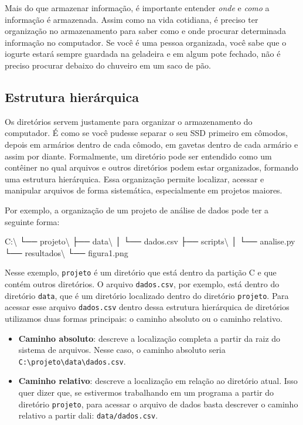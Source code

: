 \documentclass[
  brazilian,
  letterpaper,
  DIV=11,
  numbers=noendperiod]{scrreprt}
\newenvironment{Shaded}{\begin{snugshade}}{\end{snugshade}}
\newcommand{\NormalTok}[1]{\textcolor[rgb]{0.00,0.23,0.31}{#1}}
\providecommand{\tightlist}{%
  \setlength{\itemsep}{0pt}\setlength{\parskip}{0pt}}
\begin{document}
Mais do que armazenar informação, é importante entender \emph{onde} e
\emph{como} a informação é armazenada. Assim como na vida cotidiana, é
preciso ter organização no armazenamento para saber como e onde procurar
determinada informação no computador. Se você é uma pessoa organizada,
você sabe que o iogurte estará sempre guardada na geladeira e em algum
pote fechado, não é preciso procurar debaixo do chuveiro em um saco de
pão.

\subsection{Estrutura hierárquica}\label{estrutura-hieruxe1rquica}

Os diretórios servem justamente para organizar o armazenamento do
computador. É como se você pudesse separar o seu SSD primeiro em
cômodos, depois em armários dentro de cada cômodo, em gavetas dentro de
cada armário e assim por diante. Formalmente, um diretório pode ser
entendido como um contêiner no qual arquivos e outros diretórios podem
estar organizados, formando uma estrutura hierárquica. Essa organização
permite localizar, acessar e manipular arquivos de forma sistemática,
especialmente em projetos maiores.

Por exemplo, a organização de um projeto de análise de dados pode ter a
seguinte forma:

\begin{Shaded}
\begin{Highlighting}[]
\NormalTok{C:\textbackslash{}}
\NormalTok{└── projeto\textbackslash{}}
\NormalTok{    ├── data\textbackslash{}}
\NormalTok{    │   └── dados.csv}
\NormalTok{    ├── scripts\textbackslash{}}
\NormalTok{    │   └── analise.py}
\NormalTok{    └── resultados\textbackslash{}}
\NormalTok{        └── figura1.png}
\end{Highlighting}
\end{Shaded}

Nesse exemplo, \texttt{projeto} é um diretório que está dentro da
partição C e que contém outros diretórios. O arquivo \texttt{dados.csv},
por exemplo, está dentro do diretório \texttt{data}, que é um diretório
localizado dentro do diretório \texttt{projeto}. Para acessar esse
arquivo \texttt{dados.csv} dentro dessa estrutura hierárquica de
diretórios utilizamos duas formas principais: o caminho absoluto ou o
caminho relativo.

\begin{itemize}
\tightlist
\item
  \textbf{Caminho absoluto}: descreve a localização completa a partir da
  raiz do sistema de arquivos. Nesse caso, o caminho absoluto seria
  \texttt{C:\textbackslash{}projeto\textbackslash{}data\textbackslash{}dados.csv}.
\item
  \textbf{Caminho relativo}: descreve a localização em relação ao
  diretório atual. Isso quer dizer que, se estivermos trabalhando em um
  programa a partir do diretório \texttt{projeto}, para acessar o
  arquivo de dados basta descrever o caminho relativo a partir dali:
  \texttt{data/dados.csv}.
\end{itemize}
\end{document}
